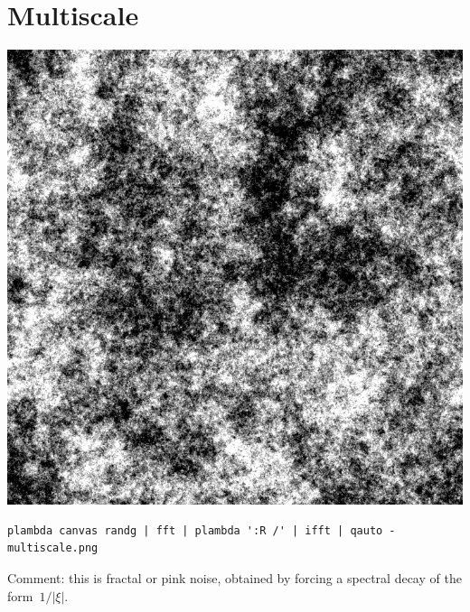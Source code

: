 \section{Multiscale}
\includegraphics{multiscale.png}
\begin{verbatim}
plambda canvas randg | fft | plambda ':R /' | ifft | qauto - multiscale.png
\end{verbatim}

Comment: this is fractal or pink noise, obtained by forcing a spectral decay
of the form~$1/|\xi|$.

